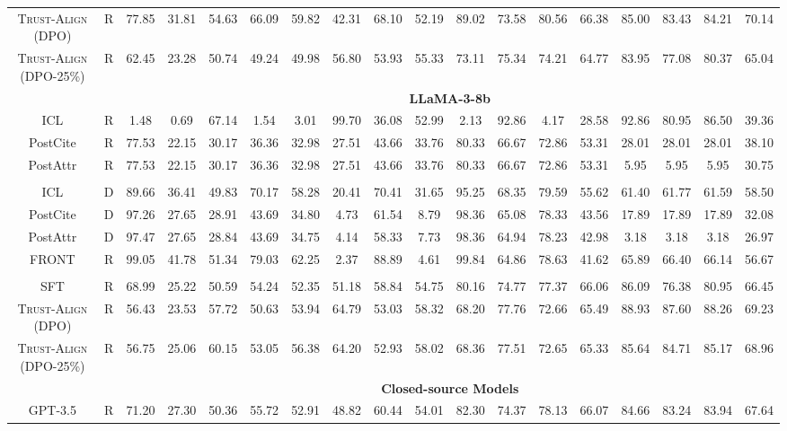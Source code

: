 \documentclass{article} %
\newcommand{\method}[0]{\textsc{Trust-Align}}
\begin{document}
\begin{table}[htb!]
{\begin{tabular}{ccc*{15}c}
\method{} (DPO) & R & 77.85 & 31.81 & 54.63 & 66.09 & 59.82 & 42.31 & 68.10 & 52.19 & 89.02 & 73.58 & 80.56 & 66.38 & 85.00 & 83.43 & 84.21 & 70.14 \\
\method{} (DPO-25\%) & R & 62.45 & 23.28 & 50.74 & 49.24 & 49.98 & 56.80 & 53.93 & 55.33 & 73.11 & 75.34 & 74.21 & 64.77 & 83.95 & 77.08 & 80.37 & 65.04 \\

& & \multicolumn{16}{c}{\cellcolor[gray]{0.9}\textbf{LLaMA-3-8b}} \\
ICL & R & 1.48 & 0.69 & 67.14 & 1.54 & 3.01 & 99.70 & 36.08 & 52.99 & 2.13 & 92.86 & 4.17 & 28.58 & 92.86 & 80.95 & 86.50 & 39.36 \\
PostCite & R & 77.53 & 22.15 & 30.17 & 36.36 & 32.98 & 27.51 & 43.66 & 33.76 & 80.33 & 66.67 & 72.86 & 53.31 & 28.01 & 28.01 & 28.01 & 38.10 \\
PostAttr & R & 77.53 & 22.15 & 30.17 & 36.36 & 32.98 & 27.51 & 43.66 & 33.76 & 80.33 & 66.67 & 72.86 & 53.31 & 5.95 & 5.95 & 5.95 & 30.75 \\\\
ICL & D & 89.66 & 36.41 & 49.83 & 70.17 & 58.28 & 20.41 & 70.41 & 31.65 & 95.25 & 68.35 & 79.59 & 55.62 & 61.40 & 61.77 & 61.59 & 58.50 \\
PostCite & D & 97.26 & 27.65 & 28.91 & 43.69 & 34.80 & 4.73 & 61.54 & 8.79 & 98.36 & 65.08 & 78.33 & 43.56 & 17.89 & 17.89 & 17.89 & 32.08 \\
PostAttr & D & 97.47 & 27.65 & 28.84 & 43.69 & 34.75 & 4.14 & 58.33 & 7.73 & 98.36 & 64.94 & 78.23 & 42.98 & 3.18 & 3.18 & 3.18 & 26.97 \\
FRONT & R & 99.05 & 41.78 & 51.34 & 79.03 & 62.25 & 2.37 & 88.89 & 4.61 & 99.84 & 64.86 & 78.63 & 41.62 & 65.89 & 66.40 & 66.14 & 56.67 \\\\

SFT & R & 68.99 & 25.22 & 50.59 & 54.24 & 52.35 & 51.18 & 58.84 & 54.75 & 80.16 & 74.77 & 77.37 & 66.06 & 86.09 & 76.38 & 80.95 & 66.45 \\
\method{} (DPO) & R & 56.43 & 23.53 & 57.72 & 50.63 & 53.94 & 64.79 & 53.03 & 58.32 & 68.20 & 77.76 & 72.66 & 65.49 & 88.93 & 87.60 & 88.26 & 69.23 \\
\method{} (DPO-25\%) & R & 56.75 & 25.06 & 60.15 & 53.05 & 56.38 & 64.20 & 52.93 & 58.02 & 68.36 & 77.51 & 72.65 & 65.33 & 85.64 & 84.71 & 85.17 & 68.96 \\

& & \multicolumn{16}{c}{\cellcolor[gray]{0.9}\textbf{Closed-source Models}} \\
GPT-3.5 & R & 71.20 & 27.30 & 50.36 & 55.72 & 52.91 & 48.82 & 60.44 & 54.01 & 82.30 & 74.37 & 78.13 & 66.07 & 84.66 & 83.24 & 83.94 & 67.64 \\


\end{tabular}}
\end{table}
\end{document}
